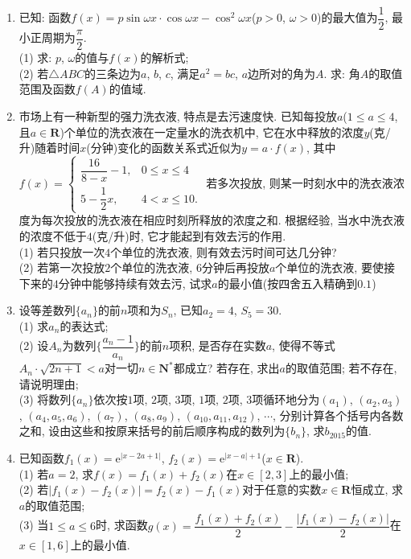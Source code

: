 \documentclass[10pt,a4paper]{article}
\begin{document}
\begin{enumerate}[1.]
\item 已知: 函数$f(x)=p\sin \omega x\cdot \cos \omega x-\cos ^2\omega x$($p>0$, $\omega >0$)的最大值为$\dfrac 12$, 最小正周期为$\dfrac{\pi}2$.\\
(1) 求: $p$, $\omega$的值与$f(x)$的解析式;\\
(2) 若$\triangle ABC$的三条边为$a$, $b$, $c$, 满足$a^2=bc$, $a$边所对的角为$A$. 求: 角$A$的取值范围及函数$f(A)$的值域.
\item 市场上有一种新型的强力洗衣液, 特点是去污速度快. 已知每投放$a$($1\le a\le 4$, 且$a\in \mathbf{R}$)个单位的洗衣液在一定量水的洗衣机中, 它在水中释放的浓度$y$(克/升)随着时间$x$(分钟)变化的函数关系式近似为$y=a\cdot f(x)$, 其中$f(x)=\begin{cases} \dfrac{16}{8-x}-1, & 0\le x\le 4 \\ 5-\dfrac 12x, & 4<x\le 10. \end{cases}$ 若多次投放, 则某一时刻水中的洗衣液浓度为每次投放的洗衣液在相应时刻所释放的浓度之和. 根据经验, 当水中洗衣液的浓度不低于$4$(克/升)时, 它才能起到有效去污的作用.\\
(1) 若只投放一次$4$个单位的洗衣液, 则有效去污时间可达几分钟?\\
(2) 若第一次投放$2$个单位的洗衣液, $6$分钟后再投放$a$个单位的洗衣液, 要使接下来的$4$分钟中能够持续有效去污, 试求$a$的最小值(按四舍五入精确到$0.1$)
\item 设等差数列$\{a_n\}$的前$n$项和为$S_n$, 已知$a_2=4$, $S_5=30$.\\
(1) 求$a_n$的表达式;\\
(2) 设$A_n$为数列$\{\dfrac{a_n-1}{a_n}\}$的前$n$项积, 是否存在实数$a$, 使得不等式$A_n\cdot \sqrt {2n+1}<a$对一切$n\in \mathbf{N}^*$都成立? 若存在, 求出$a$的取值范围; 若不存在, 请说明理由;\\
(3) 将数列$\{a_n\}$依次按$1$项, $2$项, $3$项, $1$项, $2$项, $3$项循环地分为$(a_1)$, $(a_2,a_3)$, $(a_4,a_5,a_6)$, $(a_7)$, $(a_8,a_9)$, $(a_{10},a_{11},a_{12})$, $\cdots$, 分别计算各个括号内各数之和, 设由这些和按原来括号的前后顺序构成的数列为$\{b_n\}$, 求$b_{2015}$的值.
\item 已知函数$f_1(x)=\mathrm{e}^{|x-2a+1|}$, $f_2(x)=\mathrm{e}^{|x-a|+1}$($x\in \mathbf{R}$).\\
(1) 若$a=2$, 求$f(x)=f_1(x)+f_2(x)$在$x\in [2,3]$上的最小值;\\
(2) 若$|f_1(x)-f_2(x)|=f_2(x)-f_1(x)$对于任意的实数$x\in \mathbf{R}$恒成立, 求$a$的取值范围;\\
(3) 当$1\le a\le 6$时, 求函数$g(x)=\dfrac{f_1(x)+f_2(x)}2-\dfrac{|f_1(x)-f_2(x)|}2$在$x\in [1, 6]$上的最小值.



\end{enumerate}
\end{document}
